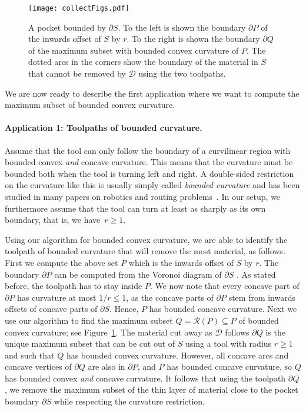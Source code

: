 \documentclass{article}
\newcommand{\PP}{P}
\newcommand{\QQ}{Q}
\newcommand{\cutdisk}{\mathcal D}
\newcommand{\tool}{\cutdisk}
\newcommand{\round}{\mathcal R}
\begin{document}
\begin{figure}
\centering
\texttt{[image: collectFigs.pdf]}
\caption{A pocket bounded by $\partial S$. To the left is shown
the boundary $\partial\PP$ of the inwards offset of $S$ by $r$. 
To the right is shown the boundary $\partial\QQ$ of the maximum subset
with bounded
convex curvature of $\PP$.
The dotted arcs in
the corners show the boundary of the material in $S$
that cannot be removed by $\tool$ using the two toolpaths.}
\label{beforeAfterRounding}
\end{figure}

We are now ready to describe the first application where we
want to compute the maximum subset of bounded
convex curvature.

\paragraph{Application 1: Toolpaths of bounded curvature.}
Assume that the tool can only follow the boundary of a curvilinear region with bounded convex \emph{and} concave curvature.
This means that the curvature must be bounded both when the tool is turning left and right.
A double-sided restriction on the curvature like this is usually simply called \emph{bounded curvature} and has been studied in many papers on robotics and routing problems~\cite{agarwal2002curvature,ahn2012reachability,ayala2015length,lazard2002complexity,lee2000approximation}.
In our setup, we furthermore assume that the tool can turn at least as sharply as its own boundary, that is, we have~$r\geq 1$.

Using our algorithm for bounded convex curvature, we are able to identify the toolpath of bounded curvature that will remove the most material, as follows.
First we compute the above set $\PP$ which is the inwards offset of $S$ by $r$.
The boundary $\partial\PP$ can be computed from the Voronoi diagram of $\partial S$ \cite{held1998voronoi}.
As stated before, the toolpath has to stay inside $\PP$.
We now note that every concave part of $\partial\PP$ has curvature at most $1/r\leq 1$, as the concave parts of $\partial\PP$ stem from inwards offsets of concave parts of $\partial S$.
Hence, $\PP$ has bounded concave curvature.
Next we use our algorithm to find the maximum subset $\QQ=\round(\PP)\subseteq \PP$ of bounded convex curvature; see Figure~\ref{beforeAfterRounding}.
The material cut away as $\tool$ follows $\partial\QQ$ is the unique maximum subset that can be cut out of $S$ using a tool with radius $r\geq 1$ and such that $\QQ$ has bounded convex curvature.
However, all concave arcs and concave vertices of $\partial\QQ$ are also in $\partial\PP$, and $\PP$ has bounded concave curvature, so $\QQ$ has bounded convex \emph{and} concave curvature.
It follows that using the toolpath $\partial\QQ$, we remove the maximum subset of the thin layer of material close to the pocket boundary $\partial S$ while respecting the curvature restriction. \\
\end{document}
